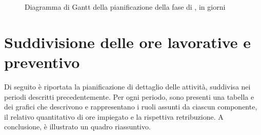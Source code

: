 \begin{figure}[H]
\label{tab:ganttpa1}
\caption{Diagramma di Gantt della pianificazione della fase di \VV, in giorni}
\end{figure}





	
\section{Suddivisione delle ore lavorative e preventivo} \label{sec:preventivo}

Di seguito è riportata la pianificazione di dettaglio delle attività, suddivisa nei periodi descritti precedentemente. Per ogni periodo, sono presenti una tabella e dei grafici che descrivono e rappresentano i ruoli assunti da ciascun componente, il relativo quantitativo di ore impiegato e la rispettiva retribuzione.
A conclusione, è illustrato un quadro riassuntivo.

\newcommand{\roww}[7]{
	#1 & #2 & #3 & #4 & #5 & #6 & #7
}

\newcommand{\x}[7]{
	\begin{figure}[h]
		\begin{tabular}{ | l | c | c | c | c | c | c | r   }
			\hline
			Ruolo / persona & \R & \AM & \AN & \PJ & \PG & \V & Totale ore per persona \\ \hline
			\PB & \roww[#1] \\ \hline
			\LB & \roww[#2] \\ \hline
			\GG & \roww[#3] \\ \hline
			\MM & \roww[#4] \\ \hline
			\LS & \roww[#5] \\ \hline
			\AZ & \roww[#6] \\ \hline
			Totale ore per ruolo & \roww[#7] \\ \hline
		\end{tabular}
	\end{figure}
}

